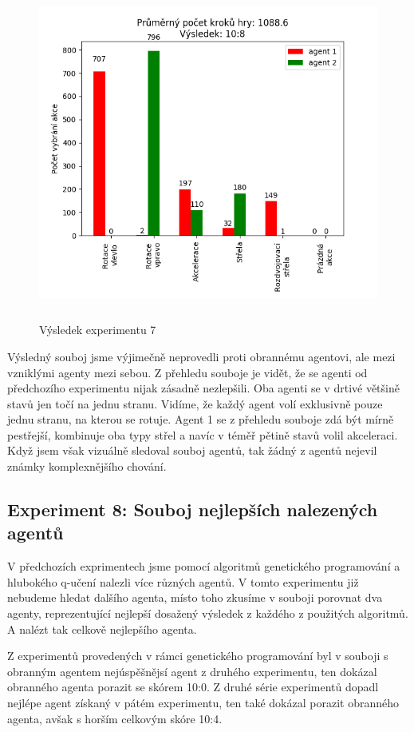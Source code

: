 \begin{figure}[p]\centering
\includegraphics[width=145mm, height=110mm]{./Obrazky/Experiment07Results.png}
\caption{Výsledek experimentu 7}
\label{Výsledek experimentu 07}
\end{figure}


Výsledný souboj jsme výjimečně neprovedli proti obrannému agentovi, ale mezi vzniklými agenty mezi sebou.
Z přehledu souboje je vidět, že se agenti od předchozího experimentu nijak zásadně nezlepšili. Oba agenti se v drtivé většině stavů jen točí na jednu stranu.
Vidíme, že každý agent volí exklusivně pouze jednu stranu, na kterou se rotuje. 
Agent 1 se z přehledu souboje zdá být mírně pestřejší, kombinuje oba typy střel a navíc v téměř pětině stavů volil akceleraci.
Když jsem však vizuálně sledoval souboj agentů, tak žádný z agentů nejevil známky komplexnějšího chování. 

\newpage
\subsection{Experiment 8: Souboj nejlepších nalezených agentů}
V předchozích exprimentech jsme pomocí algoritmů genetického programování a hlubokého q-učení nalezli více různých agentů. 
V tomto experimentu již nebudeme hledat dalšího agenta, místo toho zkusíme v souboji porovnat dva agenty, reprezentující nejlepší dosažený výsledek z každého z použitých algoritmů.
A nalézt tak celkově nejlepšího agenta.
\par
Z experimentů provedených v rámci genetického programování byl v souboji s obranným agentem nejúspěšnějsí agent z druhého experimentu, ten dokázal obranného agenta porazit se skórem 10:0.
Z druhé série experimentů dopadl nejlépe agent získaný v pátém experimentu, ten také dokázal porazit obranného agenta, avšak s horším celkovým skóre 10:4.

